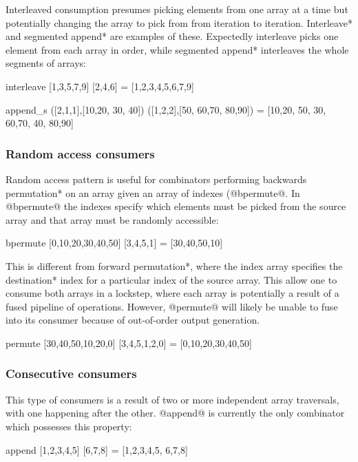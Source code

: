\documentclass[preamble.tex]{subfiles}
\begin{document}
Interleaved consumption presumes picking elements from one array at a time but potentially changing the array to pick from from iteration to iteration. \*Interleave* and \*segmented append* are examples of these. Expectedly interleave picks one element from each array in order, while \*segmented append* interleaves the whole segments of arrays:

\begin{hscode}
interleave [1,3,5,7,9] [2,4,6] = [1,2,3,4,5,6,7,9]

append_s ([2,1,1],[10,20, 30, 40]) ([1,2,2],[50, 60,70, 80,90])
  = [10,20, 50, 30, 60,70, 40, 80,90]
\end{hscode}


\subsubsection{Random access consumers}

Random access pattern is useful for combinators performing \*backwards permutation* on an array given an array of indexes (@bpermute@. In @bpermute@ the indexes specify which elements must be picked from the source array and that array must be randomly accessible:

\begin{hscode}
bpermute [0,10,20,30,40,50] [3,4,5,1] = [30,40,50,10]
\end{hscode}

This is different from \*forward permutation*, where the index array specifies the \*destination* index for a particular index of the source array. This allow one to consume both arrays in a lockstep, where each array is potentially a result of a fused pipeline of operations. However, @permute@ will likely be unable to fuse into its consumer because of out-of-order output generation.

\begin{hscode}
permute [30,40,50,10,20,0] [3,4,5,1,2,0] = [0,10,20,30,40,50]
\end{hscode}


\subsubsection{Consecutive consumers}

This type of consumers is a result of two or more independent array traversals, with one happening after the other. @append@ is currently the only combinator which possesses this property:

\begin{hscode}
append [1,2,3,4,5] [6,7,8] = [1,2,3,4,5, 6,7,8]
\end{hscode}
\end{document}
